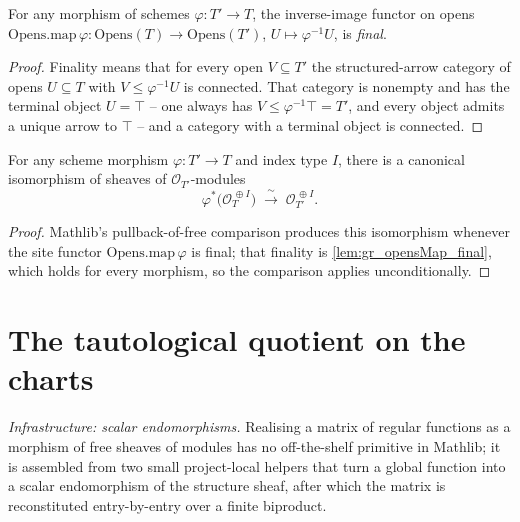 \begin{lemma}\leanok
  \label{lem:gr_opensMap_final}
  For any morphism of schemes \(\varphi : T' \to T\), the inverse-image functor on opens
  \(\mathrm{Opens.map}\,\varphi : \mathrm{Opens}(T) \to \mathrm{Opens}(T')\),
  \(U \mapsto \varphi^{-1}U\), is \emph{final}.
\end{lemma}

\begin{proof}


\leanok
  Finality means that for every open \(V \subseteq T'\) the structured-arrow category of
  opens \(U \subseteq T\) with \(V \le \varphi^{-1}U\) is connected. That category is
  nonempty and has the terminal object \(U = \top\) -- one always has
  \(V \le \varphi^{-1}\top = T'\), and every object admits a unique arrow to \(\top\) --
  and a category with a terminal object is connected.
\end{proof}

\begin{lemma}\leanok
  \label{lem:gr_pullbackFreeIso}
  For any scheme morphism \(\varphi : T' \to T\) and index type \(I\), there is a canonical
  isomorphism of sheaves of \(\mathcal{O}_{T'}\)-modules
  \[
    \varphi^{*}\bigl(\mathcal{O}_T^{\,\oplus I}\bigr)
      \;\xrightarrow{\ \sim\ }\;
    \mathcal{O}_{T'}^{\,\oplus I}.
  \]
\end{lemma}

\begin{proof}
  \leanok
  Mathlib's pullback-of-free comparison produces this isomorphism whenever the site functor
  \(\mathrm{Opens.map}\,\varphi\) is final; that finality is \cref{lem:gr_opensMap_final},
  which holds for every morphism, so the comparison applies unconditionally.
\end{proof}


\section{The tautological quotient on the charts}
\label{sec:grquot_chart}

\emph{Infrastructure: scalar endomorphisms.} Realising a matrix of regular
functions as a morphism of free sheaves of modules has no off-the-shelf primitive
in Mathlib; it is assembled from two small project-local helpers that turn a global
function into a scalar endomorphism of the structure sheaf, after which the matrix
is reconstituted entry-by-entry over a finite biproduct.

